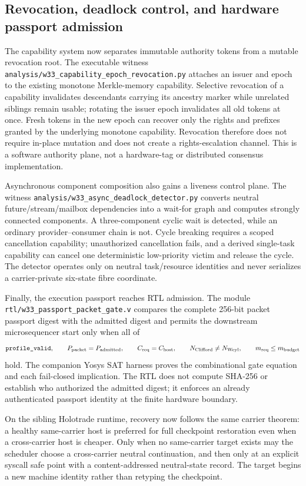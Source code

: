 \subsection{Revocation, deadlock control, and hardware passport admission}

The capability system now separates immutable authority tokens from a mutable
revocation root.  The executable witness
\texttt{analysis/w33\_capability\_epoch\_revocation.py} attaches an issuer and
epoch to the existing monotone Merkle-memory capability.  Selective revocation
of a capability invalidates descendants carrying its ancestry marker while
unrelated siblings remain usable; rotating the issuer epoch invalidates all old
tokens at once.  Fresh tokens in the new epoch can recover only the rights and
prefixes granted by the underlying monotone capability.  Revocation therefore
does not require in-place mutation and does not create a rights-escalation
channel.  This is a software authority plane, not a hardware-tag or distributed
consensus implementation.

Asynchronous component composition also gains a liveness control plane.  The
witness \texttt{analysis/w33\_async\_deadlock\_detector.py} converts neutral
future/stream/mailbox dependencies into a wait-for graph and computes strongly
connected components.  A three-component cyclic wait is detected, while an
ordinary provider--consumer chain is not.  Cycle breaking requires a scoped
cancellation capability; unauthorized cancellation fails, and a derived
single-task capability can cancel one deterministic low-priority victim and
release the cycle.  The detector operates only on neutral task/resource
identities and never serializes a carrier-private six-state fibre coordinate.

Finally, the execution passport reaches RTL admission.  The module
\texttt{rtl/w33\_passport\_packet\_gate.v} compares the complete 256-bit packet
passport digest with the admitted digest and permits the downstream
microsequencer start only when all of
\[
 \texttt{profile\_valid},\qquad
 P_{\rm packet}=P_{\rm admitted},\qquad
 C_{\rm req}=C_{\rm host},\qquad
 N_{\rm Clifford}\ne N_{\rm Weyl},\qquad
 m_{\rm req}\le m_{\rm budget}
\]
hold.  The companion Yosys SAT harness proves the combinational gate equation
and each fail-closed implication.  The RTL does not compute SHA-256 or establish
who authorized the admitted digest; it enforces an already authenticated
passport identity at the finite hardware boundary.

On the sibling Holotrade runtime, recovery now follows the same carrier theorem:
a healthy same-carrier host is preferred for full checkpoint restoration even
when a cross-carrier host is cheaper.  Only when no same-carrier target exists
may the scheduler choose a cross-carrier neutral continuation, and then only at
an explicit syscall safe point with a content-addressed neutral-state record.
The target begins a new machine identity rather than retyping the checkpoint.
